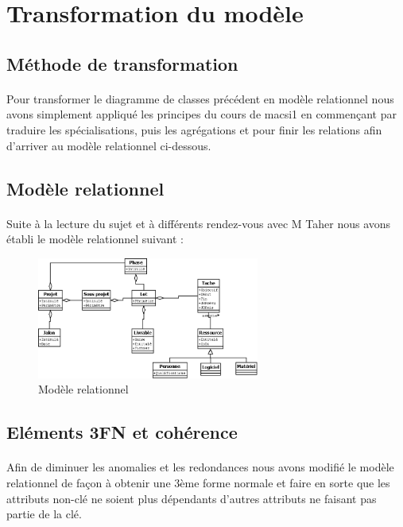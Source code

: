 \documentclass[a4paper, 12pt]{article}
\begin{document}
\newpage

\section{Transformation du modèle}
\subsection{Méthode de transformation}
\paragraph{}Pour transformer le diagramme de classes précédent en modèle relationnel nous avons simplement appliqué les principes du cours de macsi1 en commençant par traduire les spécialisations, puis les agrégations et pour finir les relations afin d'arriver au modèle relationnel ci-dessous.

\subsection{Modèle relationnel}
\paragraph{}Suite à la lecture du sujet et à différents rendez-vous avec M Taher nous avons établi le modèle relationnel suivant :

\begin{figure}[h!]
	\centering
	\includegraphics[height=4cm]{Classe.png}
	\caption{Modèle relationnel}
\end{figure}

\subsection{Eléments 3FN et cohérence}
\paragraph{} Afin de diminuer les anomalies et les redondances nous avons modifié le modèle relationnel de façon à obtenir une 3ème forme normale et faire en sorte que les attributs non-clé ne soient plus dépendants d’autres attributs ne faisant pas partie de la clé.
\end{document}
